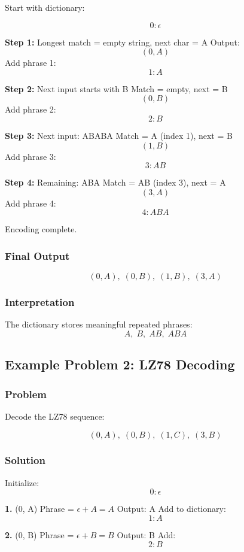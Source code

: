 \documentclass{AnantDocumentation}
\begin{document}
Start with dictionary:

\[
0: \epsilon
\]

\textbf{Step 1:}  
Longest match = empty string, next char = A  
Output:
\[
(0, A)
\]
Add phrase 1:
\[
1: A
\]

\textbf{Step 2:}  
Next input starts with B  
Match = empty, next = B  
\[
(0, B)
\]
Add phrase 2:
\[
2: B
\]

\textbf{Step 3:}  
Next input: ABABA  
Match = A (index 1), next = B  
\[
(1, B)
\]
Add phrase 3:
\[
3: AB
\]

\textbf{Step 4:}  
Remaining: ABA  
Match = AB (index 3), next = A  
\[
(3, A)
\]
Add phrase 4:
\[
4: ABA
\]

Encoding complete.

\subsubsection*{Final Output}

\[
(0,A),\; (0,B),\; (1,B),\; (3,A)
\]

\subsubsection*{Interpretation}

The dictionary stores meaningful repeated phrases:
\[
A,\; B,\; AB,\; ABA
\]

\subsection{Example Problem 2: LZ78 Decoding}

\subsubsection*{Problem}

Decode the LZ78 sequence:

\[
(0, A),\; (0, B),\; (1, C),\; (3, B)
\]

\subsubsection*{Solution}

Initialize:
\[
0:\epsilon
\]

\textbf{1. } (0, A)  
Phrase = \(\epsilon + A = A\)  
Output: A  
Add to dictionary:
\[
1: A
\]

\textbf{2. } (0, B)  
Phrase = \(\epsilon + B = B\)  
Output: B  
Add:
\[
2: B
\]
\end{document}
